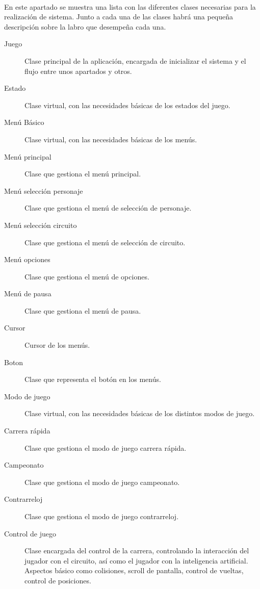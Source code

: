 \paragraph{}
En este apartado se muestra una lista con las diferentes clases necesarias para la realización de sistema. Junto a cada una de
las clases habrá una pequeña descripción sobre la labro que desempeña cada una.

\begin{description}
    \item [Juego] Clase principal de la aplicación, encargada de inicializar el sistema y el flujo entre unos apartados y otros.
    \item [Estado] Clase virtual, con las necesidades básicas de los estados del juego.
    
    \item [Menú Básico] Clase virtual, con las necesidades básicas de los menús.
    \item [Menú principal] Clase que gestiona el menú principal.
    \item [Menú selección personaje] Clase que gestiona el menú de selección de personaje.
    \item [Menú selección circuito] Clase que gestiona el menú de selección de circuito.
    \item [Menú opciones] Clase que gestiona el menú de opciones.
    \item [Menú de pausa] Clase que gestiona el menú de pausa.
    \item [Cursor] Cursor de los menús.
    \item [Boton] Clase que representa el botón en los menús.
    
    \item [Modo de juego] Clase virtual, con las necesidades básicas de los distintos modos de juego.
    \item [Carrera rápida] Clase que gestiona el modo de juego carrera rápida.
    \item [Campeonato] Clase que gestiona el modo de juego campeonato.
    \item [Contrarreloj] Clase que gestiona el modo de juego contrarreloj.
    
    \item [Control de juego] Clase encargada del control de la carrera, controlando la interacción del jugador con el circuito, así 
    como el jugador con la inteligencia artificial. Aspectos básico como colisiones, scroll de pantalla, control de vueltas, control
    de posiciones.
    

\end{description}
